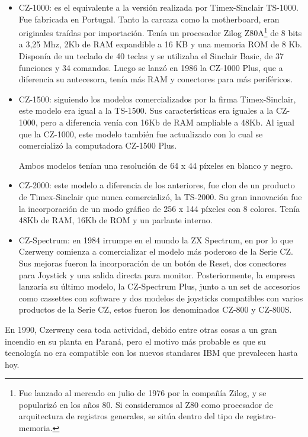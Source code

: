 \documentclass[%
 	final,
%
	notitlepage,
	narroweqnarray,
	inline,
 	twoside,
	]{ieee}
\begin{document}
\begin{itemize}

\item CZ-1000: es el equivalente a la versi\'on realizada por Timex-Sinclair TS-1000. Fue fabricada en Portugal. Tanto la carcaza como la motherboard, eran originales tra\'idas por importaci\'on. Ten\'ia un procesador  Zilog Z80A\footnote{Fue lanzado al mercado en julio de 1976 por la compa\~n\'ia Zilog, y se populariz\'o en los a\~nos 80. Si consideramos al Z80 como procesador de arquitectura de registros generales, se sitúa dentro del tipo de registro-memoria.\cite{z80}} de 8 bits a 3,25 Mhz, 2Kb de RAM expandible a 16 KB y una memoria ROM de 8 Kb. Dispon\'ia de un teclado de 40 teclas y se utilizaba el Sinclair Basic, de 37 funciones y 34 comandos.
Luego se lanz\'o en 1986 la CZ-1000 Plus, que a diferencia su antecesora, ten\'ia m\'as RAM y conectores para m\'as perif\'ericos.

\item CZ-1500: siguiendo los modelos comercializados por la firma Timex-Sinclair, este modelo era igual a la TS-1500. Sus caracter\'isticas era iguales a la CZ-1000, pero a diferencia ven\'ia con 16Kb de RAM ampliable a 48Kb.
Al igual que la CZ-1000, este modelo tambi\'en fue actualizado con lo cual se comercializ\'o la computadora CZ-1500 Plus.

Ambos modelos ten\'ian una resoluci\'on de 64 x 44 p\'ixeles en blanco y negro.

\item CZ-2000: este modelo a diferencia de los anteriores, fue clon de un producto de Timex-Sinclair que nunca comercializ\'o, la TS-2000. Su gran innovaci\'on fue la incorporaci\'on de un modo gr\'afico de 256 x 144 p\'ixeles con 8 colores. Ten\'ia 48Kb de RAM, 16Kb de ROM y un parlante interno.

\item CZ-Spectrum: en 1984 irrumpe en el mundo la ZX Spectrum, en por lo que Czerweny comienza a comercializar el modelo m\'as poderoso de la Serie CZ. Sus mejoras fueron la incorporaci\'on de un bot\'on de Reset, dos conectores para Joystick y una salida directa para monitor.
Posteriormente, la empresa lanzar\'ia su \'ultimo modelo, la CZ-Spectrum Plus, junto a un set de accesorios como cassettes con software y dos modelos de joysticks compatibles con varios productos de la Serie CZ, estos fueron los denominados CZ-800 y CZ-800S.
\end{itemize}

En 1990, Czerweny cesa toda actividad, debido entre otras cosas a un gran incendio en su planta en Paran\'a, pero el motivo m\'as probable es que su tecnolog\'ia no era compatible con los nuevos standares IBM que prevalecen hasta hoy.
\end{document}
